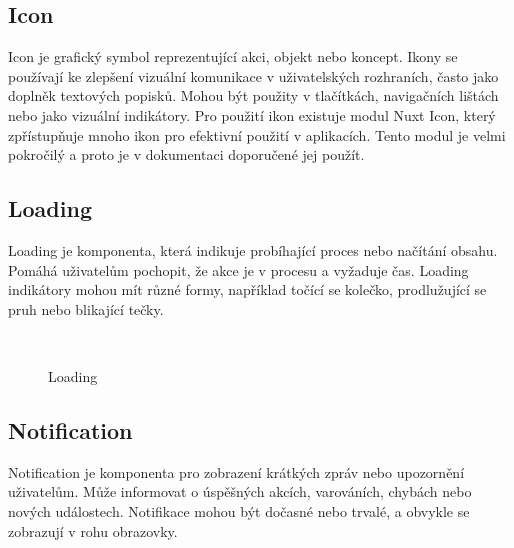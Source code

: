 \subsection{Icon}
Icon je grafický symbol reprezentující akci, objekt nebo koncept. Ikony se používají ke zlepšení vizuální komunikace v uživatelských rozhraních, často jako doplněk textových popisků. Mohou být použity v tlačítkách, navigačních lištách nebo jako vizuální indikátory. Pro použití ikon existuje modul Nuxt Icon, který zpřístupňuje mnoho ikon pro efektivní použití v aplikacích. Tento modul je velmi pokročilý a proto je v dokumentaci doporučené jej použít.

\subsection{Loading}
Loading je komponenta, která indikuje probíhající proces nebo načítání obsahu. Pomáhá uživatelům pochopit, že akce je v procesu a vyžaduje čas. Loading indikátory mohou mít různé formy, například točící se kolečko, prodlužující se pruh nebo blikající tečky.

\begin{figure}[H]
  \centering
  \hspace{1cm}
  \\
  \captionsetup{justification=centering,margin=2cm}
  \caption{Loading}
\end{figure}

\subsection{Notification}
Notification je komponenta pro zobrazení krátkých zpráv nebo upozornění uživatelům. Může informovat o úspěšných akcích, varováních, chybách nebo nových událostech. Notifikace mohou být dočasné nebo trvalé, a obvykle se zobrazují v rohu obrazovky.

